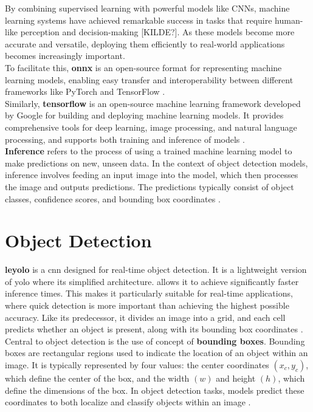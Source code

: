 By combining supervised learning with powerful models like CNNs, machine learning systems have achieved remarkable success in tasks that require human-like perception and decision-making [KILDE?]. As these models become more accurate and versatile, deploying them efficiently to real-world applications becomes increasingly important.  \\

To facilitate this, \textbf{\gls{onnx}} is an open-source format for representing machine learning models, enabling easy transfer and interoperability between different frameworks like PyTorch and TensorFlow \cite{roboflow:onnx}. \\

Similarly, \textbf{tensorflow} is an open-source machine learning framework developed by Google for building and deploying machine learning models. It provides comprehensive tools for deep learning, image processing, and natural language processing, and supports both training and inference of models \cite{nvidia:tensorflow}. \\

\textbf{Inference} refers to the process of using a trained machine learning model to make predictions on new, unseen data. In the context of object detection models, inference involves feeding an input image into the model, which then processes the image and outputs predictions. The predictions typically consist of object classes, confidence scores, and bounding box coordinates \cite{nvidia:inference}. \\

\section{Object Detection}

\textbf{\gls{leyolo}} is a \gls{cnn} designed for real-time object detection. It is a lightweight version of \gls{yolo} where its simplified architecture. allows it to achieve significantly faster inference times. This makes it particularly suitable for real-time applications, where quick detection is more important than achieving the highest possible accuracy. Like its predecessor, it divides an image into a grid, and each cell predicts whether an object is present, along with its bounding box coordinates \cite{openreview:leyolo}.\\

Central to object detection is the use of concept of \textbf{bounding boxes}. Bounding boxes are rectangular regions used to indicate the location of an object within an image. It is typically represented by four values: the center coordinates \((x_c, y_c)\), which define the center of the box, and the width \((w)\) and height \((h)\), which define the dimensions of the box. In object detection tasks, models predict these coordinates to both localize and classify objects within an image \cite{peopleforai:boundingbox}. \\

